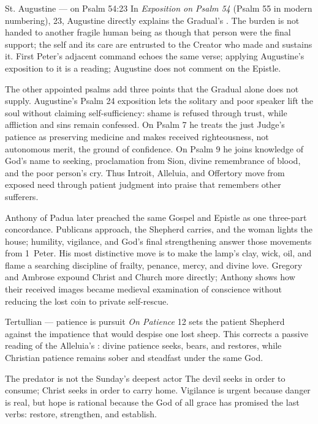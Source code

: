 \begin{sourcecard}{St. Augustine --- on Psalm 54:23}
In \emph{Exposition on Psalm 54} (Psalm 55 in modern numbering), 23, Augustine directly explains the Gradual's . The burden is not handed to another fragile human being as though that person were the final support; the self and its care are entrusted to the Creator who made and sustains it. First Peter's adjacent command echoes the same verse; applying Augustine's exposition to it is a reading; Augustine does not comment on the Epistle.
\end{sourcecard}

The other appointed psalms add three points that the Gradual alone does not supply. Augustine's Psalm 24 exposition lets the solitary and poor speaker lift the soul without claiming self-sufficiency: shame is refused through trust, while affliction and sins remain confessed. On Psalm 7 he treats the just Judge's patience as preserving medicine and makes received righteousness, not autonomous merit, the ground of confidence. On Psalm 9 he joins knowledge of God's name to seeking, proclamation from Sion, divine remembrance of blood, and the poor person's cry. Thus Introit, Alleluia, and Offertory move from exposed need through patient judgment into praise that remembers other sufferers.

Anthony of Padua later preached the same Gospel and Epistle as one three-part concordance. Publicans approach, the Shepherd carries, and the woman lights the house; humility, vigilance, and God's final strengthening answer those movements from 1~Peter. His most distinctive move is to make the lamp's clay, wick, oil, and flame a searching discipline of frailty, penance, mercy, and divine love. Gregory and Ambrose expound Christ and Church more directly; Anthony shows how their received images became medieval examination of conscience without reducing the lost coin to private self-rescue.

\begin{sourcecard}{Tertullian --- patience is pursuit}
\emph{On Patience} 12 sets the patient Shepherd against the impatience that would despise one lost sheep. This corrects a passive reading of the Alleluia's : divine patience seeks, bears, and restores, while Christian patience remains sober and steadfast under the same God.
\end{sourcecard}

\begin{massbox}{The predator is not the Sunday's deepest actor}
The devil seeks in order to consume; Christ seeks in order to carry home. Vigilance is urgent because danger is real, but hope is rational because the God of all grace has promised the last verbs: restore, strengthen, and establish.
\end{massbox}

